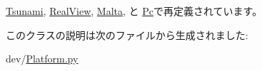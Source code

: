 \hyperlink{classTsunami_1_1Tsunami_acce15679d830831b0bbe8ebc2a60b2ca}{Tsunami}, \hyperlink{classRealView_1_1RealView_acce15679d830831b0bbe8ebc2a60b2ca}{RealView}, \hyperlink{classMalta_1_1Malta_acce15679d830831b0bbe8ebc2a60b2ca}{Malta}, と \hyperlink{classPc_1_1Pc_acce15679d830831b0bbe8ebc2a60b2ca}{Pc}で再定義されています。

このクラスの説明は次のファイルから生成されました:\begin{DoxyCompactItemize}
\item 
dev/\hyperlink{Platform_8py}{Platform.py}\end{DoxyCompactItemize}
